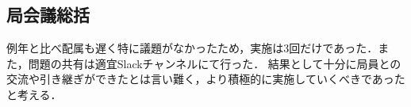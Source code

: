 \subsection*{局会議総括}


例年と比べ配属も遅く特に議題がなかったため，実施は3回だけであった．また，問題の共有は適宜Slackチャンネルにて行った．
結果として十分に局員との交流や引き継ぎができたとは言い難く，より積極的に実施していくべきであったと考える．
